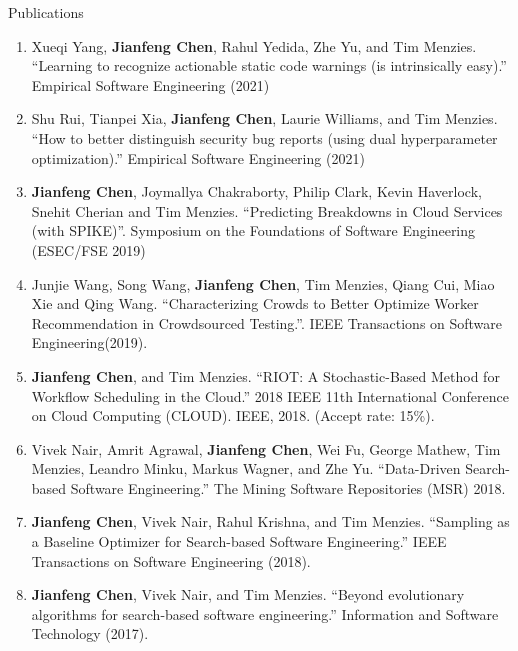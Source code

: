 \documentclass{resume} %
\begin{document}
\begin{rSection}{ Publications} 
\begin{enumerate}[wide, labelwidth=!, labelindent=0pt]
\item Xueqi Yang, \textbf{Jianfeng Chen}, Rahul Yedida, Zhe Yu, and Tim Menzies. ``Learning to recognize actionable static code warnings (is intrinsically easy).'' Empirical Software Engineering (2021)

\item Shu Rui, Tianpei Xia, \textbf{Jianfeng Chen}, Laurie Williams, and Tim Menzies. ``How to better distinguish security bug reports (using dual hyperparameter optimization).'' Empirical Software Engineering (2021)

\item \textbf{Jianfeng Chen}, Joymallya Chakraborty, Philip Clark, Kevin Haverlock, Snehit Cherian and Tim Menzies. ``Predicting Breakdowns in Cloud Services (with SPIKE)''. Symposium on the Foundations of Software Engineering (ESEC/FSE 2019)
\item Junjie Wang, Song Wang, \textbf{Jianfeng Chen}, Tim Menzies, Qiang Cui, Miao Xie and  Qing Wang. ``Characterizing Crowds to Better Optimize Worker Recommendation in Crowdsourced Testing.''. IEEE Transactions on Software Engineering(2019).
\item \textbf{Jianfeng Chen}, and Tim Menzies. ``RIOT: A Stochastic-Based Method for Workflow Scheduling in the Cloud.'' 2018 IEEE 11th International Conference on Cloud Computing (CLOUD). IEEE, 2018. (Accept rate: 15\%).
\item Vivek Nair, Amrit Agrawal, \textbf{Jianfeng Chen}, Wei Fu, George Mathew, Tim Menzies, Leandro Minku, Markus Wagner, and Zhe Yu. ``Data-Driven Search-based Software Engineering.'' The Mining Software Repositories (MSR) 2018.

\item \textbf{Jianfeng Chen}, Vivek Nair, Rahul Krishna, and Tim Menzies. ``Sampling as a Baseline Optimizer for Search-based Software Engineering.'' IEEE Transactions on Software Engineering (2018).
\item \textbf{Jianfeng Chen}, Vivek Nair, and Tim Menzies. ``Beyond evolutionary algorithms for search-based software engineering.'' Information and Software Technology (2017).


\end{enumerate}
\end{rSection}
\end{document}
